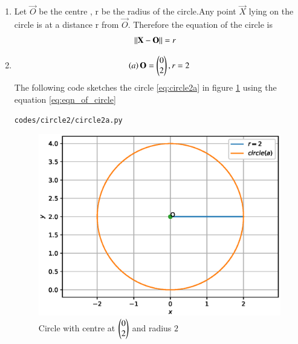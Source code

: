 \renewcommand{\theequation}{\theenumi}
\begin{enumerate}[label=\thesection.\arabic*.,ref=\thesection.\theenumi]

\item Let $\vec{O}$ be the centre , r be the radius of the circle.Any point $\vec{X}$ lying on the circle is at a distance r from $\vec{O}$.
\newline
Therefore the equation of the circle is 
\begin{align}
\left\lVert\mathbf{X}-\mathbf{O}\right\rVert &=r
\label{eq:eqn_of_circle}
\end{align}

\item
\begin{align}
\left(a\right)\mathbf{O}=\begin{pmatrix}0\\2\end{pmatrix},r=2
\label{eq:circle2a}
\end{align}
The following code sketches the circle \ref{eq:circle2a} in figure \ref{fig:circle2a} using the equation \ref{eq:eqn_of_circle}
\begin{lstlisting}
codes/circle2/circle2a.py
\end{lstlisting}
\begin{figure}[!ht]
\centering
\includegraphics[width=\columnwidth]{./codes/circle2/pyfigs/circle2a.eps}
\caption{Circle with centre at $\begin{pmatrix}0\\2\end{pmatrix}$ and radius $2$}
\label{fig:circle2a}
\end{figure}


\end{enumerate}

